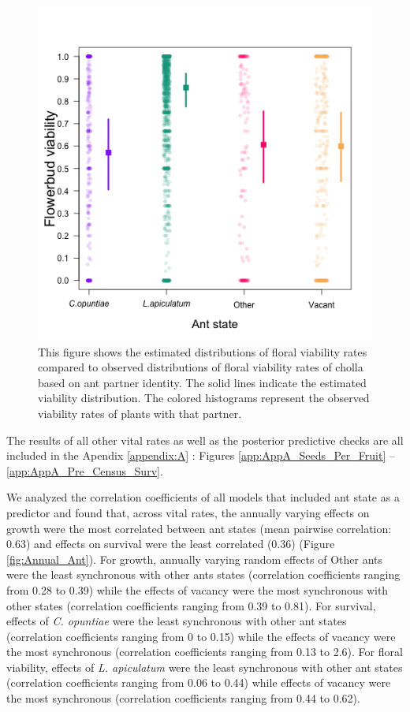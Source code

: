 \documentclass[11pt]{article}
\begin{document}
\begin{figure}[H]
	\includegraphics[width=0.95\linewidth]{Figures/Viab_v2.png}
	\caption{This figure shows the estimated distributions of floral viability rates compared to observed distributions of floral viability rates of cholla based on ant partner identity. The solid lines indicate the estimated viability distribution. The colored histograms represent the observed viability rates of plants with that partner. }
	\label{fig:Viab}
\end{figure}

The results of all other vital rates as well as the posterior predictive checks are all included in the Apendix \ref{appendix:A} : Figures \ref{app:AppA_Seeds_Per_Fruit} -- \ref{app:AppA_Pre_Census_Surv}.

We analyzed the correlation coefficients of all models that included ant state as a predictor and found that, across vital rates, the annually varying effects on growth were the most correlated between ant states (mean pairwise correlation: 0.63) and effects on survival were the least correlated (0.36) (Figure \ref{fig:Annual_Ant}). 
For growth, annually varying random effects of Other ants were the least synchronous with other ants states (correlation coefficients ranging from 0.28 to 0.39) while the effects of vacancy were the most synchronous with other states (correlation coefficients ranging from 0.39 to 0.81).
For survival, effects of \textit{C. opuntiae} were the least synchronous with other ant states (correlation coefficients ranging from 0 to 0.15) while the effects of vacancy were the most synchronous (correlation coefficients ranging from 0.13 to 2.6).
For floral viability, effects of \textit{L. apiculatum} were the least synchronous with other ant states (correlation coefficients ranging from 0.06 to 0.44) while effects of vacancy were the most synchronous (correlation coefficients ranging from 0.44 to 0.62).
\end{document}

